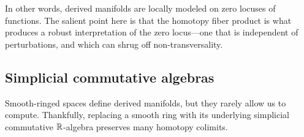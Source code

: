 In other words, derived manifolds are locally modeled on zero locuses of functions. The salient point here is that the homotopy fiber product is what produces a robust interpretation of the zero locus---one that is independent of perturbations, and which can shrug off non-transversality.




\subsection{Simplicial commutative algebras}

Smooth-ringed spaces define derived manifolds, but they rarely allow us to compute. Thankfully, replacing a smooth ring with its underlying simplicial commutative $\mathbb R$-algebra preserves many homotopy colimits.


